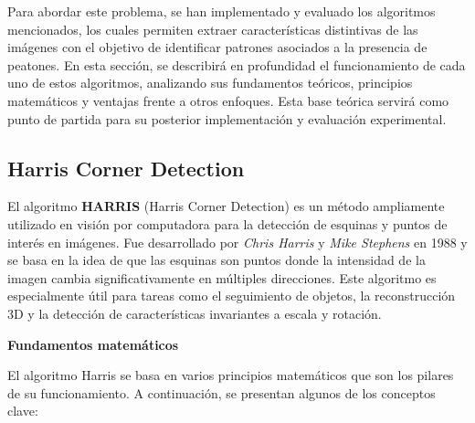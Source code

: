 \documentclass[a4paper]{article}
\begin{document}
 Para abordar este problema, se han implementado y evaluado los algoritmos mencionados, 
 los cuales permiten extraer características distintivas de las imágenes con el objetivo de identificar patrones asociados 
 a la presencia de peatones. En esta sección, se describirá en profundidad el funcionamiento de cada uno de estos algoritmos, analizando sus fundamentos teóricos, principios matemáticos y ventajas frente a otros enfoques. Esta base teórica servirá como punto de partida para su posterior implementación y evaluación experimental.
 

  \subsection{Harris Corner Detection}
  \par\vspace{0.5cm}

  El algoritmo \textbf{HARRIS} (Harris Corner Detection) es un método ampliamente utilizado en visión por computadora para la detección de esquinas y puntos de interés en imágenes. Fue desarrollado por \textit{Chris Harris} y \textit{Mike Stephens} en 1988 
  y se basa en la idea de que las esquinas son puntos donde la intensidad de la imagen cambia significativamente en múltiples direcciones. Este algoritmo es especialmente útil para tareas como el seguimiento de objetos, la reconstrucción 3D y la detección 
  de características invariantes a escala y rotación.

  \par\vspace{0.5cm}
  \textbf{Fundamentos matemáticos}
  \par\vspace{0.5cm}
  
  El algoritmo Harris se basa en varios principios matemáticos que son los pilares de su funcionamiento.
   A continuación, se presentan algunos de los conceptos clave:
  
\end{document}

